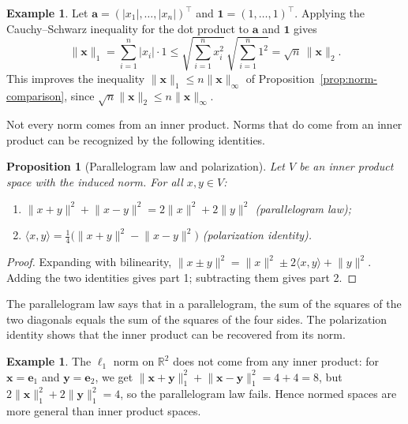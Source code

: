 \documentclass[11pt]{article}
\newcommand{\norm}[1]{\lVert #1 \rVert}
\newcommand{\ip}[2]{\langle #1, #2 \rangle}
\theoremstyle{definition}
\newtheorem{example}[definition]{Example}
\theoremstyle{plain}
\newtheorem{proposition}[definition]{Proposition}
\theoremstyle{remark}
\begin{document}
\begin{example}\label{ex:l1-l2}
    Let $\mathbf{a} = (|x_1|, \ldots, |x_n|)^\top$ and $\mathbf{1} = (1, \ldots, 1)^\top$. Applying the Cauchy--Schwarz inequality for the dot product to $\mathbf{a}$ and $\mathbf{1}$ gives
    \[\norm{\mathbf{x}}_1 = \sum_{i=1}^n |x_i| \cdot 1 \leq \sqrt{\sum_{i=1}^n x_i^2} \, \sqrt{\sum_{i=1}^n 1^2} = \sqrt{n} \, \norm{\mathbf{x}}_2.\]
    This improves the inequality $\norm{\mathbf{x}}_1 \leq n \norm{\mathbf{x}}_\infty$ of Proposition~\ref{prop:norm-comparison}, since $\sqrt{n} \norm{\mathbf{x}}_2 \leq n \norm{\mathbf{x}}_\infty$.
\end{example}

Not every norm comes from an inner product. Norms that do come from an inner product can be recognized by the following identities.

\begin{proposition}[Parallelogram law and polarization]\label{prop:parallelogram}
    Let $V$ be an inner product space with the induced norm. For all $x, y \in V$:
    \begin{enumerate}
        \item $\norm{x + y}^2 + \norm{x - y}^2 = 2\norm{x}^2 + 2\norm{y}^2$ (parallelogram law);
        \item $\ip{x}{y} = \frac{1}{4}\big(\norm{x + y}^2 - \norm{x - y}^2\big)$ (polarization identity).
    \end{enumerate}
\end{proposition}

\begin{proof}
    Expanding with bilinearity, $\norm{x \pm y}^2 = \norm{x}^2 \pm 2\ip{x}{y} + \norm{y}^2$. Adding the two identities gives part 1; subtracting them gives part 2.
\end{proof}

The parallelogram law says that in a parallelogram, the sum of the squares of the two diagonals equals the sum of the squares of the four sides. The polarization identity shows that the inner product can be recovered from its norm.

\begin{example}
    The $\ell_1$ norm on $\mathbb{R}^2$ does not come from any inner product: for $\mathbf{x} = \mathbf{e}_1$ and $\mathbf{y} = \mathbf{e}_2$, we get $\norm{\mathbf{x} + \mathbf{y}}_1^2 + \norm{\mathbf{x} - \mathbf{y}}_1^2 = 4 + 4 = 8$, but $2\norm{\mathbf{x}}_1^2 + 2\norm{\mathbf{y}}_1^2 = 4$, so the parallelogram law fails. Hence normed spaces are more general than inner product spaces.
\end{example}
\end{document}
